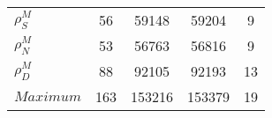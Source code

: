 \begin{center}
\begin{longtable}{lcccc}
$ {\rho^{M}_{S}}       $	 & 	                   56	 & 	                59148	 & 	                59204	 & 	                    9 \\ 
$ {\rho^{M}_{N}}       $	 & 	                   53	 & 	                56763	 & 	                56816	 & 	                    9 \\ 
$ {\rho^{M}_{D}}       $	 & 	                   88	 & 	                92105	 & 	                92193	 & 	                   13 \\ 
$Maximum               $	 & 	                  163	 & 	               153216	 & 	               153379	 & 	                   19 \\ 
\end{longtable}
 \end{center}
